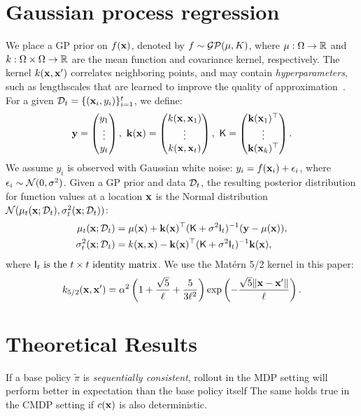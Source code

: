 \appendix

\section{Gaussian process regression}
\label{sec:gps}
We place a GP prior on $f({\mathbf{x}})$, denoted by $f \sim \operatorname{\mathcal{GP}}(\mu, K)$, where $\mu:\Omega\to{\mathbb R}$ and $k:\Omega\times\Omega\to{\mathbb R}$ are the mean function and covariance kernel, respectively.
The kernel $k({\mathbf{x}}, {\mathbf{x}}')$ correlates neighboring points, and may contain \textit{hyperparameters}, such as lengthscales that are learned to improve the quality of approximation~\citep{Rasmussen2006}. 
For a given ${\mathcal{D}}_t = \{ ({\mathbf{x}}_i, y_i) \}_{i=1}^t$, we define:
\[
    {\mathbf{y}} = \begin{pmatrix}y_1 \\\vdots\\ y_t\end{pmatrix},
    \,\,
    {\mathbf{k}}({\mathbf{x}}) = \begin{pmatrix} k({\mathbf{x}}, {\mathbf{x}}_1) \\\vdots\\ k({\mathbf{x}}, {\mathbf{x}}_t)\end{pmatrix},
    \,\,
    \mathsf{K} = \begin{pmatrix}{\mathbf{k}}({\mathbf{x}}_1)^\top \\\vdots\\ {\mathbf{k}}({\mathbf{x}}_k)^\top\end{pmatrix}.
\]
We assume $y_i$ is observed with Gaussian white noise: $y_i = f({\mathbf{x}}_i) + \epsilon_i$, where $\epsilon_i \sim {\mathcal N}(0, \sigma^2)$.
Given a GP prior and data ${\mathcal{D}}_t$, the resulting posterior distribution for function values at a location ${\mathbf{x}}$ is the Normal distribution ${\mathcal N}(\mu_t({\mathbf{x}} ; {\mathcal{D}}_t), \sigma^2_t({\mathbf{x}}; {\mathcal{D}}_t))$:
\begin{align*}
    \mu_t({\mathbf{x}} ; {\mathcal{D}}_t) &= \mu({\mathbf{x}}) + {\mathbf{k}}({\mathbf{x}})^\top(\mathsf{K} + \sigma^2\mathsf{I}_t)^{-1}({\mathbf{y}} - \mu({\mathbf{x}})), \\
    \sigma^2_t({\mathbf{x}}; {\mathcal{D}}_t) &= k({\mathbf{x}}, {\mathbf{x}}) - {\mathbf{k}}({\mathbf{x}})^\top(\mathsf{K} + \sigma^2\mathsf{I}_t)^{-1}{\mathbf{k}}({\mathbf{x}}),
\end{align*}
where $\mathsf{I}_t \text{ is the $t \times t$ identity matrix}$. We use the Mat{\'e}rn 5/2 kernel in this paper:
\[
    k_{\text{5/2}}({\mathbf{x}}, {\mathbf{x}}') = \alpha^2\left( 1 + \frac{\sqrt{5}}{\ell} + \frac{5}{3\ell^2}\right) \exp\left(-\frac{\sqrt{5}\|{\mathbf{x}}-{\mathbf{x}}'\|}{\ell} \right).
\]




\section{Theoretical Results}
If a base policy $\tilde \pi$ is \textit{sequentially consistent}, rollout in the MDP setting will perform better in expectation than the base policy itself
The same holds true in the CMDP setting if $c({\mathbf{x}})$ is also deterministic. 

